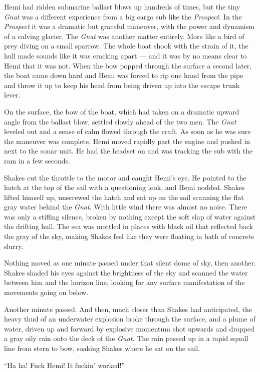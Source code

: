 \documentclass[]{scrbook}
\begin{document}
Hemi had ridden submarine ballast blows up hundreds of times, but the
tiny \emph{Gnat} was a different experience from a big cargo sub like
the \emph{Prospect}. In the \emph{Prospect} it was a dramatic but
graceful maneuver, with the power and dynamism of a calving glacier. The
\emph{Gnat} was another matter entirely. More like a bird of prey diving
on a small sparrow. The whole boat shook with the strain of it, the hull
made sounds like it was cracking apart --- and it was by no means clear
to Hemi that it was not. When the bow popped through the surface a
second later, the boat came down hard and Hemi was forced to rip one
hand from the pipe and throw it up to keep his head from being driven up
into the escape trunk lever.

On the surface, the bow of the boat, which had taken on a dramatic
upward angle from the ballast blow, settled slowly ahead of the two men.
The \emph{Gnat} leveled out and a sense of calm flowed through the
craft. As soon as he was sure the maneuver was complete, Hemi moved
rapidly past the engine and pushed in next to the sonar unit. He had the
headset on and was tracking the sub with the ram in a few seconds.

Shakes cut the throttle to the motor and caught Hemi's eye. He pointed
to the hatch at the top of the sail with a questioning look, and Hemi
nodded. Shakes lifted himself up, unscrewed the hatch and sat up on the
sail scanning the flat gray water behind the \emph{Gnat}. With little
wind there was almost no noise. There was only a stifling silence,
broken by nothing except the soft slap of water against the drifting
hull. The sea was mottled in places with black oil that reflected back
the gray of the sky, making Shakes feel like they were floating in bath
of concrete slurry.

Nothing moved as one minute passed under that silent dome of sky, then
another. Shakes shaded his eyes against the brightness of the sky and
scanned the water between him and the horizon line, looking for any
surface manifestation of the movements going on below.

Another minute passed. And then, much closer than Shakes had
anticipated, the heavy thud of an underwater explosion broke through the
surface, and a plume of water, driven up and forward by explosive
momentum shot upwards and dropped a gray oily rain onto the deck of the
\emph{Gnat}. The rain passed up in a rapid squall line from stern to
bow, soaking Shakes where he sat on the sail.

``Ha ha! Fuck Hemi! It fuckin' worked!''
\end{document}
